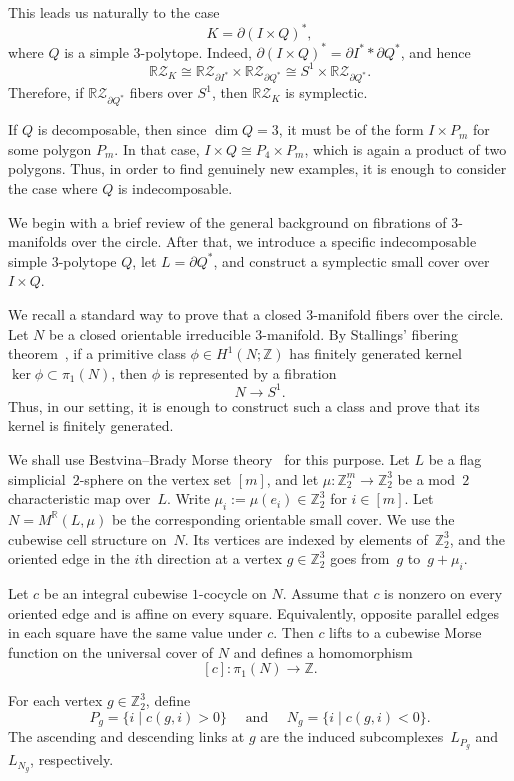 \documentclass{amsart}
\numberwithin{equation}{section}
\theoremstyle{definition}
\theoremstyle{remark}
\newcommand{\Z}{\mathbb Z}
\newcommand{\R}{\mathbb R}
\newcommand{\RZ}{\mathbb R\mathcal Z}
\DeclareMathOperator{\join}{\ast}
\begin{document}
This leads us naturally to the case 
$$
    K=\partial(I\times Q)^\ast,
$$
where $Q$ is a simple $3$-polytope.
Indeed, $\partial(I\times Q)^\ast=\partial I^\ast \join \partial Q^\ast$, and hence
$$
    \RZ_K \cong \RZ_{\partial I^\ast}\times \RZ_{\partial Q^\ast} \cong S^1\times \RZ_{\partial Q^\ast}.
$$
Therefore, if $\RZ_{\partial Q^\ast}$ fibers over $S^1$, then $\RZ_K$ is symplectic.

If $Q$ is decomposable, then since $\dim Q=3$, it must be of the form $I\times P_m$ for some polygon $P_m$.
In that case, $I\times Q \cong P_4\times P_m$, which is again a product of two polygons.
Thus, in order to find genuinely new examples, it is enough to consider the case where $Q$ is indecomposable.

We begin with a brief review of the general background on fibrations of $3$-manifolds over the circle.
After that, we introduce a specific indecomposable simple $3$-polytope $Q$, let $L=\partial Q^\ast$, and construct a symplectic small cover over~$I\times Q$.


We recall a standard way to prove that a closed $3$-manifold fibers over the circle.
Let $N$ be a closed orientable irreducible $3$-manifold.
By Stallings' fibering theorem~\cite{Stallings1961}, if a primitive class $\phi\in H^1(N;\Z)$ has finitely generated kernel $\ker\phi\subset \pi_1(N)$, then $\phi$ is represented by a fibration 
$$
    N\to S^1.
$$
Thus, in our setting, it is enough to construct such a class and prove that its kernel is finitely generated.

We shall use Bestvina--Brady Morse theory~\cite{Bestvina-Brady1997} for this purpose.
Let $L$ be a flag simplicial~$2$-sphere on the vertex set $[m]$, and let $\mu\colon \Z_2^m\to \Z_2^3$ be a mod~$2$ characteristic map over~$L$.
Write $\mu_i:=\mu(e_i)\in \Z_2^3$ for $i\in [m]$.
Let $N=M^\R(L,\mu)$ be the corresponding orientable small cover.
We use the cubewise cell structure on~$N$.
Its vertices are indexed by elements of~$\Z_2^3$, and the oriented edge in the $i$th direction at a vertex $g\in\Z_2^3$ goes from~$g$ to~$g+\mu_i$.

Let $c$ be an integral cubewise $1$-cocycle on $N$.
Assume that $c$ is nonzero on every oriented edge and is affine on every square.
Equivalently, opposite parallel edges in each square have the same value under $c$.
Then $c$ lifts to a cubewise Morse function on the universal cover of $N$ and defines a homomorphism
$$
    [c]\colon \pi_1(N)\to \Z.
$$

For each vertex $g\in\Z_2^3$, define
$$
    P_g=\{i\mid c(g,i)>0\} \quad \text{ and } \quad N_g=\{i\mid c(g,i)<0\}.
$$
The ascending and descending links at $g$ are the induced subcomplexes~$L_{P_g}$ and~$L_{N_g}$, respectively.
\end{document}
